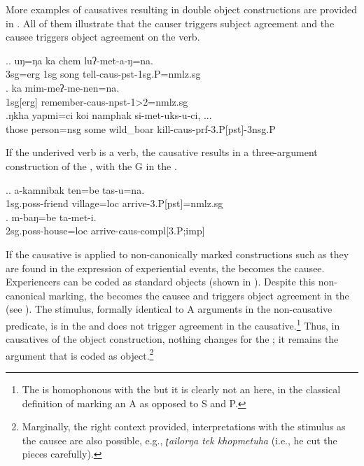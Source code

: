  
 
More examples of causatives resulting in double object constructions are provided in \Next. All of them illustrate  that the causer triggers subject agreement and the causee triggers object agreement on the verb. 

\ex.\ag. uŋ=ŋa ka chem luʔ-met-a-ŋ=na.\\
{\sc 3sg=erg} {\sc 1sg} song tell{\sc -caus-pst-1sg.P=nmlz.sg}\\
\bg. ka mim-meʔ-me-nen=na.\\
{\sc 1sg[erg]} remember{\sc -caus-npst-1>2=nmlz.sg} \\
\bg.ŋkha yapmi=ci    koi  namphak   si-met-uks-u-ci, ...\\
those person{\sc =nsg} some wild\_boar kill{\sc -caus-prf-3.P[pst]-3nsg.P}\\

If the underived verb is a  verb, the causative results in a three-argument construction of the , with the G in the  .

\ex.\ag. a-kamnibak ten=be tas-u=na.\\
{\sc 1sg.poss-}friend  village{\sc =loc} arrive{\sc -3.P[pst]=nmlz.sg}\\
\bg. m-baŋ=be  ta-met-i.\\
{\sc 2sg.poss-}house{\sc =loc} arrive{\sc -caus-compl[3.P;imp]}\\


If the causative is applied to non-canonically marked constructions such as they are found in the expression of experiential events, the   becomes the causee. Experiencers can be coded as standard objects (shown in \Next[a]). Despite this non-canonical marking, the  becomes the causee and triggers object agreement in the  (see \Next[b]). The stimulus, formally identical to A arguments in the non-causative predicate, is in the   and does not trigger agreement in the causative.\footnote{The  is homophonous with the  but it is clearly not an  here, in the classical definition of marking an A as opposed to S and P.} Thus, in causatives of the object  construction, nothing changes for the ; it remains the argument that is coded as object.\footnote{Marginally, the right context provided, interpretations with the stimulus as the causee are also possible, e.g., \emph{ʈailorŋa tek khopmetuha}  (i.e., he cut the pieces carefully).} 


